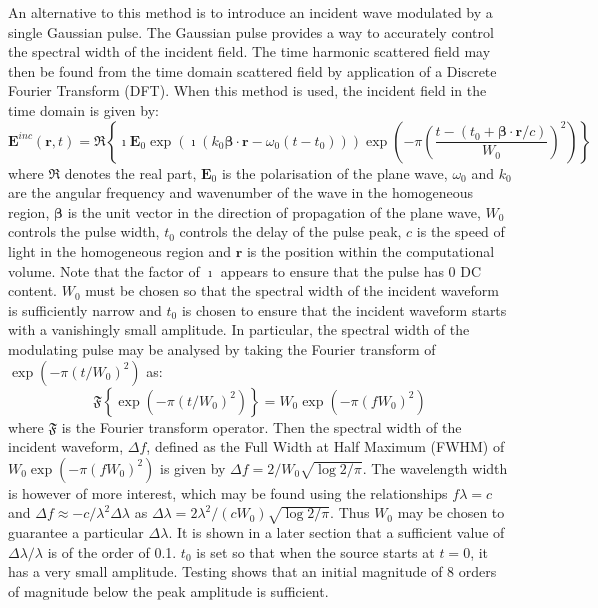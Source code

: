 \documentclass[a4paper, 12pt]{article}
\begin{document}
	An alternative to this method is to introduce an incident wave
	modulated by a single Gaussian pulse. The Gaussian pulse provides a
	way to accurately control the spectral width of the incident field. The time harmonic scattered field may then be found from the time
	domain scattered field by application of a Discrete Fourier Transform
	(DFT). When this method is used, the incident field in the time domain is
	given by:
	\begin{equation}
		\label{eq:fdtd:tdinc}
		\mathbf{E}^{inc}(\mathbf{r},t)=\Re\left\{\imath\mathbf{E}_0\exp(\imath(k_0\boldsymbol{\beta}\!\cdot\!\mathbf{r}-\omega_0(t-t_0)))\exp\left(-\pi\left(\frac{t-(t_0+\boldsymbol{\beta}\!\cdot\!\mathbf{r}/c)}{W_0}\right)^2\right)\right\}
	\end{equation}
	where $\Re$ denotes the real part, $\mathbf{E}_0$ is the
	polarisation of the plane wave,
	$\omega_0$ and $k_0$ are the angular frequency and wavenumber of the
	wave in the homogeneous region, $\boldsymbol{\beta}$ is the unit vector in the
	direction of propagation of the plane wave, $W_0$
	controls the pulse width, $t_0$ controls the delay of the pulse
	peak, $c$ is the speed of light in the homogeneous region and $\mathbf{r}$ is the position within the computational volume. Note that the factor of $\imath$ appears to ensure that the
	pulse has 0 DC content. $W_0$
	must be chosen so that the spectral width of the incident waveform is
	sufficiently narrow and $t_0$ is chosen to ensure that the incident
	waveform starts with a vanishingly small amplitude. In particular, the
	spectral width of the modulating pulse may be analysed by taking the
	Fourier transform of $\exp(-\pi(t/W_0)^2)$ as:
	\begin{equation}
		\label{eq:fdtd:specwid}
		\mathfrak{F}\left\{\exp(-\pi(t/W_0)^2)\right\}=W_0\exp(-\pi(fW_0)^2)
	\end{equation}
	where $\mathfrak{F}$ is the Fourier transform operator. Then the
	spectral width of the incident waveform, $\Delta f$, defined as the
	Full Width at Half Maximum (FWHM) of $W_0\exp(-\pi(fW_0)^2)$ is given
	by $\Delta f=2/W_0\sqrt{\log 2/\pi}$. The wavelength width is however
	of more interest, which may be found using the relationships
	$f\lambda=c$ and $\Delta f\approx -c/\lambda^2\Delta \lambda$ as
	$\Delta \lambda=2\lambda^2/(c W_0)\sqrt{\log 2/\pi}$. Thus $W_0$ may
	be chosen to guarantee a particular $\Delta \lambda$. It is shown in a
	later section that a sufficient value of $\Delta \lambda/\lambda$ is
	of the order of 0.1. $t_0$ is set so that when the source starts at $t=0$,
	it has a very small amplitude. Testing shows that an initial
	magnitude of 8 orders of magnitude below the peak amplitude is
	sufficient.
\end{document}
